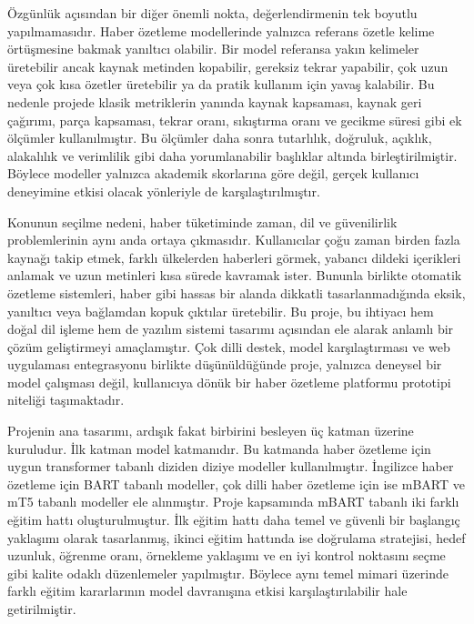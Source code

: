 Özgünlük açısından bir diğer önemli nokta, değerlendirmenin tek boyutlu yapılmamasıdır. Haber özetleme modellerinde yalnızca referans özetle kelime örtüşmesine bakmak yanıltıcı olabilir. Bir model referansa yakın kelimeler üretebilir ancak kaynak metinden kopabilir, gereksiz tekrar yapabilir, çok uzun veya çok kısa özetler üretebilir ya da pratik kullanım için yavaş kalabilir. Bu nedenle projede klasik metriklerin yanında kaynak kapsaması, kaynak geri çağırımı, parça kapsaması, tekrar oranı, sıkıştırma oranı ve gecikme süresi gibi ek ölçümler kullanılmıştır. Bu ölçümler daha sonra tutarlılık, doğruluk, açıklık, alakalılık ve verimlilik gibi daha yorumlanabilir başlıklar altında birleştirilmiştir. Böylece modeller yalnızca akademik skorlarına göre değil, gerçek kullanıcı deneyimine etkisi olacak yönleriyle de karşılaştırılmıştır.

Konunun seçilme nedeni, haber tüketiminde zaman, dil ve güvenilirlik problemlerinin aynı anda ortaya çıkmasıdır. Kullanıcılar çoğu zaman birden fazla kaynağı takip etmek, farklı ülkelerden haberleri görmek, yabancı dildeki içerikleri anlamak ve uzun metinleri kısa sürede kavramak ister. Bununla birlikte otomatik özetleme sistemleri, haber gibi hassas bir alanda dikkatli tasarlanmadığında eksik, yanıltıcı veya bağlamdan kopuk çıktılar üretebilir. Bu proje, bu ihtiyacı hem doğal dil işleme hem de yazılım sistemi tasarımı açısından ele alarak anlamlı bir çözüm geliştirmeyi amaçlamıştır. Çok dilli destek, model karşılaştırması ve web uygulaması entegrasyonu birlikte düşünüldüğünde proje, yalnızca deneysel bir model çalışması değil, kullanıcıya dönük bir haber özetleme platformu prototipi niteliği taşımaktadır.

Projenin ana tasarımı, ardışık fakat birbirini besleyen üç katman üzerine kuruludur. İlk katman model katmanıdır. Bu katmanda haber özetleme için uygun transformer tabanlı diziden diziye modeller kullanılmıştır. İngilizce haber özetleme için BART tabanlı modeller, çok dilli haber özetleme için ise mBART ve mT5 tabanlı modeller ele alınmıştır. Proje kapsamında mBART tabanlı iki farklı eğitim hattı oluşturulmuştur. İlk eğitim hattı daha temel ve güvenli bir başlangıç yaklaşımı olarak tasarlanmış, ikinci eğitim hattında ise doğrulama stratejisi, hedef uzunluk, öğrenme oranı, örnekleme yaklaşımı ve en iyi kontrol noktasını seçme gibi kalite odaklı düzenlemeler yapılmıştır. Böylece aynı temel mimari üzerinde farklı eğitim kararlarının model davranışına etkisi karşılaştırılabilir hale getirilmiştir.

